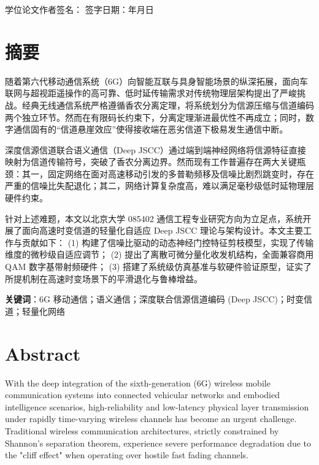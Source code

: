 \documentclass[12pt,a4paper,openany,UTF8]{ctexrep}
\begin{document}
\vspace{1.5cm}
\begin{flushright}
  学位论文作者签名：\underline{\hspace{3cm}} \qquad
  签字日期：\qquad 年\quad 月\quad 日
\end{flushright}
\newpage

\chapter*{摘\quad 要}
随着第六代移动通信系统（6G）向智能互联与具身智能场景的纵深拓展，面向车联网与超视距遥操作的高可靠、低时延传输需求对传统物理层架构提出了严峻挑战。经典无线通信系统严格遵循香农分离定理，将系统划分为信源压缩与信道编码两个独立环节。然而在有限码长约束下，分离定理渐进最优性不再成立；同时，数字通信固有的“信道悬崖效应”使得接收端在恶劣信道下极易发生通信中断。

深度信源信道联合语义通信（Deep JSCC）通过端到端神经网络将信源特征直接映射为信道传输符号，突破了香农分离边界。然而现有工作普遍存在两大关键瓶颈：其一，固定网络在面对高速移动引发的多普勒频移及信噪比剧烈跳变时，存在严重的信噪比失配退化；其二，网络计算复杂度高，难以满足毫秒级低时延物理层硬件约束。

针对上述难题，本文以北京大学 085402 通信工程专业研究方向为立足点，系统开展了面向高速时变信道的轻量化自适应 Deep JSCC 理论与架构设计。本文主要工作与贡献如下：
(1) 构建了信噪比驱动的动态神经门控特征剪枝模型，实现了传输维度的微秒级自适应调节；
(2) 提出了离散可微分量化收发机结构，全面兼容商用 QAM 数字基带射频硬件；
(3) 搭建了系统级仿真基准与软硬件验证原型，证实了所提机制在高速时变场景下的平滑退化与鲁棒增益。

\vspace{0.6cm}
\noindent \textbf{关键词}：6G 移动通信；语义通信；深度联合信源信道编码 (Deep JSCC)；时变信道；轻量化网络

\newpage

\chapter*{Abstract}
With the deep integration of the sixth-generation (6G) wireless mobile communication systems into connected vehicular networks and embodied intelligence scenarios, high-reliability and low-latency physical layer transmission under rapidly time-varying wireless channels has become an urgent challenge. Traditional wireless communication architectures, strictly constrained by Shannon's separation theorem, experience severe performance degradation due to the "cliff effect" when operating over hostile fast fading channels.
\end{document}

